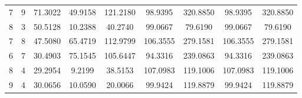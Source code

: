 \documentclass[withoutpreface,bwprint]{cumcmthesis}
\begin{document}
\begin{appendices}
\begin{table}[htbp!]
\begin{tabular}{@{}ccccccccc@{}}
				7              & 9              & 71.3022     & 49.9158     & 121.2180    & 98.9395         & 320.8850        & 98.9395         & 320.8850        \\
				8              & 3              & 50.5128     & 10.2388     & 40.2740     & 99.0667         & 79.6190         & 99.0667         & 79.6190         \\
				7              & 8              & 47.5080     & 65.4719     & 112.9799    & 106.3555        & 279.1581        & 106.3555        & 279.1581        \\
				6              & 7              & 30.4903     & 75.1545     & 105.6447    & 94.3316         & 239.0863        & 94.3316         & 239.0863        \\
				8              & 4              & 29.2954     & 9.2199      & 38.5153     & 107.0983        & 119.1006        & 107.0983        & 119.1006        \\
				9              & 4              & 30.0656     & 10.0590     & 20.0066     & 99.9424         & 119.8879        & 99.9424         & 119.8879        \\ \bottomrule
			\end{tabular}
		\end{table}
		

\end{appendices}
\end{document}
